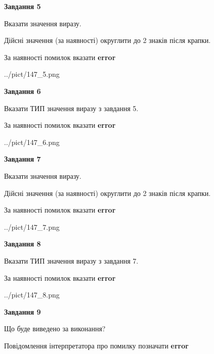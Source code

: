 \documentclass[11pt, ukrainian]{article}
\begin{document}
{\begin {large}
{\begin {center}\textbf{Завдання 5}\end {center}}\par
Вказати значення виразу. \par
Дійсні значення (за наявності) округлити до 2 знаків після крапки. \par
За наявності помилок вказати \textbf{error}

\begin{center}
	{../pict/147_5.png}
\end{center}
\newpage

{\begin {center}\textbf{Завдання 6}\end {center}}\par
Вказати ТИП значення виразу з завдання 5. \par
За наявності помилок вказати \textbf{error}

\begin{center}
	{../pict/147_6.png}
\end{center}
\newpage

{\begin {center}\textbf{Завдання 7}\end {center}}\par
Вказати значення виразу. \par
Дійсні значення (за наявності) округлити до 2 знаків після крапки. \par
За наявності помилок вказати \textbf{error}

\begin{center}
	{../pict/147_7.png}
\end{center}
\newpage

{\begin {center}\textbf{Завдання 8}\end {center}}\par
Вказати ТИП значення виразу з завдання 7. \par
За наявності помилок вказати \textbf{error}

\begin{center}
	{../pict/147_8.png}
\end{center}
\newpage

{\begin {center}\textbf{Завдання 9}\end {center}}\par
Що буде виведено за виконання? \par
Повідомлення інтерпретатора про помилку позначати \textbf{error}


\end{large}}
\end{document}
